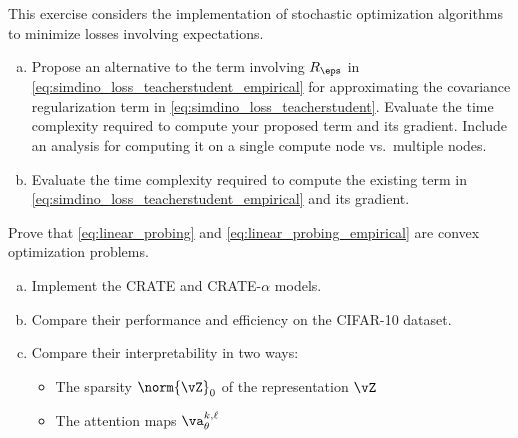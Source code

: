 \documentclass[../../book-main.tex]{subfiles}
\begin{document}
\begin{exercise}
    This exercise considers the implementation of stochastic optimization algorithms to minimize losses involving expectations.
    \begin{enumerate}[(a)]
        \item Propose an alternative to the term involving \(R_{\eps}\) in \eqref{eq:simdino_loss_teacherstudent_empirical} for approximating the covariance regularization term in \eqref{eq:simdino_loss_teacherstudent}. Evaluate the time complexity required to compute your proposed term and its gradient. Include an analysis for computing it on a single compute node vs.~multiple nodes.
        \item Evaluate the time complexity required to compute the existing term in \eqref{eq:simdino_loss_teacherstudent_empirical} and its gradient.
    \end{enumerate}
\end{exercise}

\begin{exercise}
    Prove that \eqref{eq:linear_probing} and \eqref{eq:linear_probing_empirical} are convex optimization problems.
\end{exercise}

\begin{exercise}
    \phantom{}
    \begin{enumerate}[(a)]
        \item Implement the CRATE and CRATE-\(\alpha\) models.
        \item Compare their performance and efficiency on the CIFAR-10 dataset.
        \item Compare their interpretability in two ways:
        \begin{itemize}
            \item The sparsity \(\norm{\vZ}_{0}\) of the representation \(\vZ\)
            \item The attention maps \(\va_{\theta}^{k, \ell}\)
        \end{itemize}
    \end{enumerate}
\end{exercise}
\end{document}
